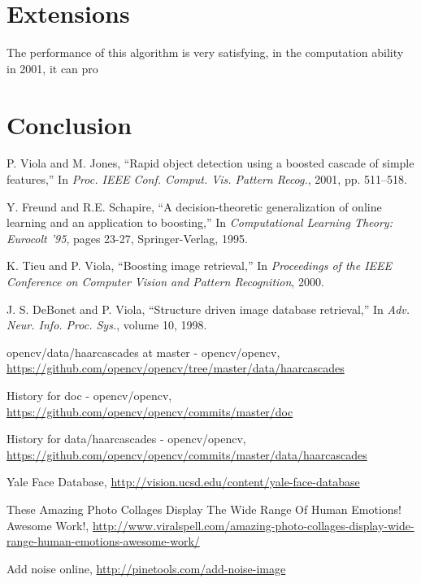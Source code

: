 \documentclass[10pt,twocolumn,letterpaper]{article}
\begin{document}
\section{Extensions}
The performance of this algorithm is very satisfying, in the computation ability in 2001, it can pro

%


\section{Conclusion}

\begin{thebibliography}{99}
P. Viola and M. Jones, ``Rapid object detection using a boosted cascade of simple features,''
In \textit{Proc. IEEE Conf. Comput. Vis. Pattern Recog.}, 2001, pp. 511–518.

Y. Freund and R.E. Schapire, ``A decision-theoretic generalization of online learning and an application to boosting,''
In \textit{Computational Learning Theory: Eurocolt '95}, pages 23-27, Springer-Verlag, 1995.

K. Tieu and P. Viola, ``Boosting image retrieval,''
In \textit{Proceedings of the IEEE Conference on Computer Vision and Pattern Recognition}, 2000.

J. S. DeBonet and P. Viola, ``Structure driven image database retrieval,''
In \textit{Adv. Neur. Info. Proc. Sys.}, volume 10, 1998.

opencv/data/haarcascades at master - opencv/opencv,
\url{https://github.com/opencv/opencv/tree/master/data/haarcascades}

History for doc - opencv/opencv,
\url{https://github.com/opencv/opencv/commits/master/doc}

History for data/haarcascades - opencv/opencv,
\url{https://github.com/opencv/opencv/commits/master/data/haarcascades}

Yale Face Database,
\url{http://vision.ucsd.edu/content/yale-face-database}

These Amazing Photo Collages Display The Wide Range Of Human Emotions! Awesome Work!,
\url{http://www.viralspell.com/amazing-photo-collages-display-wide-range-human-emotions-awesome-work/}

Add noise online,
\url{http://pinetools.com/add-noise-image}

\end{thebibliography}
\end{document}
